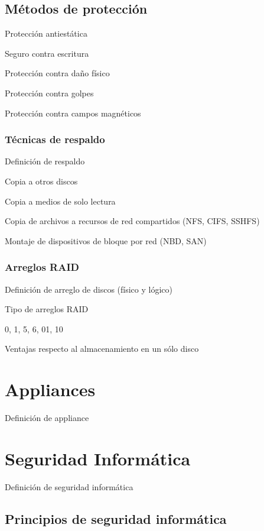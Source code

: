       \subsection {M\'{e}todos de protecci\'{o}n}

Protecci\'{o}n antiest\'{a}tica

Seguro contra escritura

Protecci\'{o}n contra da\~{n}o f\'{i}sico

Protecci\'{o}n contra golpes

Protecci\'{o}n contra campos magn\'{e}ticos

        \subsubsection {T\'{e}cnicas de respaldo}

Definici\'{o}n de respaldo

Copia a otros discos

Copia a medios de solo lectura

Copia de archivos a recursos de red compartidos (NFS, CIFS, SSHFS)

Montaje de dispositivos de bloque por red (NBD, SAN)

        \subsubsection {Arreglos RAID}

Definici\'{o}n de arreglo de discos (f\'{i}sico y l\'{o}gico)

Tipo de arreglos RAID

0, 1, 5, 6, 01, 10

Ventajas respecto al almacenamiento en un s\'{o}lo disco

    \section {Appliances}

Definici\'{o}n de appliance

    \section {Seguridad Inform\'{a}tica}
    
Definici\'{o}n de seguridad inform\'{a}tica

      \subsection {Principios de seguridad inform\'{a}tica}

